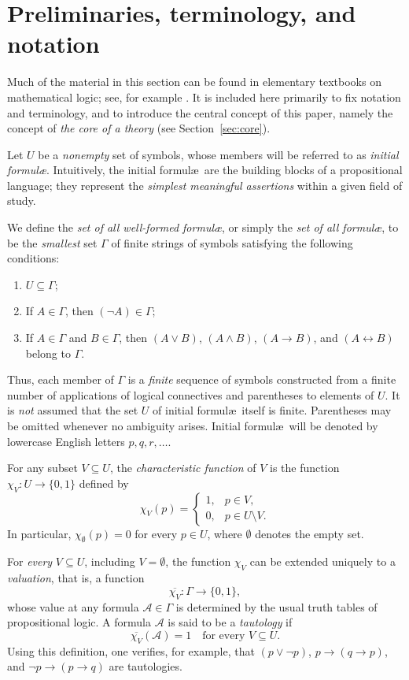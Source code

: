 \documentclass{article}   	%
\theoremstyle{plain}
\theoremstyle{definition}
\theoremstyle{remark}
\begin{document}
\section{Preliminaries, terminology, and notation}
\label{sec:basics}

Much of the material in this section can be found in elementary textbooks on mathematical logic; see, for example \cite{Enderton}.
It is included here primarily to fix notation and terminology, and to introduce the central concept of this paper, namely the concept of \emph{the core of a theory} (see Section~\ref{sec:core}).

Let $U$ be a \emph{nonempty} set of symbols, whose members will be referred to as \emph{initial formul\ae}. 
Intuitively, the initial formul\ae\ are the building blocks of a propositional language; they represent the \emph{simplest meaningful assertions} within a given field of study.

We define the \emph{set of all well-formed formul\ae}, or simply the \emph{set of all formul\ae}, to be the \emph{smallest} set $\Gamma$ of finite strings of symbols satisfying the following conditions:
\begin{enumerate}
\item $U \subseteq \Gamma$;
\item If $A \in \Gamma$, then $(\neg A) \in \Gamma$;
\item If $A \in \Gamma$ and $B \in \Gamma$, then $(A \vee B)$, $(A \wedge B)$, $(A \to B)$, and $(A \leftrightarrow B)$ belong to $\Gamma$.
\end{enumerate}

Thus, each member of $\Gamma$ is a \emph{finite} sequence of symbols constructed from a finite number of applications of logical connectives and parentheses to elements of $U$. 
It is \emph{not} assumed that the set $U$ of initial formul\ae\ itself is finite.
Parentheses may be omitted whenever no ambiguity arises.
Initial formul\ae\ will be denoted by lowercase English letters $p, q, r, \dots$.

For any subset $V \subseteq U$, the \emph{characteristic function} of $V$ is the function $\chi_V : U \to \{0,1\}$ defined by
\[
\chi_V(p) =
\begin{cases}
1, & p \in V, \\
0, & p \in U \setminus V .
\end{cases}
\]
In particular, $\chi_{\emptyset}(p) = 0$ for every $p \in U$, where $\emptyset$ denotes the empty set.

For \emph{every} $V \subseteq U$, including $V = \emptyset$, the function $\chi_V$ can be extended uniquely to a \emph{valuation}, that is, a function
\[
\overline{\chi_V} : \Gamma \to \{0,1\},
\]
whose value at any formula $\mathcal{A} \in \Gamma$ is determined by the usual truth tables of propositional logic.
A formula $\mathcal{A}$ is said to be a \emph{tautology} if
\[
\overline{\chi_V}(\mathcal{A}) = 1
\quad \text{for every } V \subseteq U .
\]
Using this definition, one verifies, for example, that $(p \vee \neg p)$, $p \to (q \to p)$, and $\neg p \to (p \to q)$ are tautologies.
\end{document}
